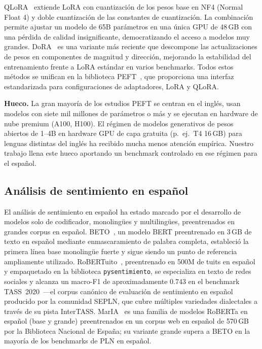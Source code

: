 \documentclass[conference]{IEEEtran}
\begin{document}
QLoRA~\cite{dettmers2023qlora} extiende LoRA con cuantización de los pesos base
en NF4 (Normal Float 4) y doble cuantización de las constantes de cuantización.
La combinación permite ajustar un modelo de 65B parámetros en una única GPU de
48\,GB con una pérdida de calidad insignificante, democratizando el acceso a
modelos muy grandes.
DoRA~\cite{liu2022dora} es una variante más reciente que descompone las
actualizaciones de pesos en componentes de magnitud y dirección, mejorando la
estabilidad del entrenamiento frente a LoRA estándar en varios benchmarks.
Todos estos métodos se unifican en la biblioteca PEFT~\cite{mangrulkar2022peft},
que proporciona una interfaz estandarizada para configuraciones de adaptadores,
LoRA y QLoRA.

\textbf{Hueco.}
La gran mayoría de los estudios PEFT se centran en el inglés, usan modelos con
siete mil millones de parámetros o más y se ejecutan en hardware de nube premium
(A100, H100).
El régimen de modelos generativos de pesos abiertos de 1--4B en hardware GPU de
capa gratuita (p.\ ej.\ T4 16\,GB) para lenguas distintas del inglés ha recibido
mucha menos atención empírica.
Nuestro trabajo llena este hueco aportando un benchmark controlado en ese régimen
para el español.

\subsection{Análisis de sentimiento en español}
\label{sec:related_sentiment}

El análisis de sentimiento en español ha estado marcado por el desarrollo de
modelos solo de codificador, monolingües y multilingües, preentrenados en
grandes corpus en español.
BETO~\cite{canete2020beto}, un modelo BERT preentrenado en 3\,GB de texto en
español mediante enmascaramiento de palabra completa, estableció la primera
línea base monolingüe fuerte y sigue siendo un punto de referencia ampliamente
utilizado.
RoBERTuito~\cite{perez2022robertuito}, preentrenado en 500M de tuits en español
y empaquetado en la biblioteca \texttt{pysentimiento}, se especializa en texto
de redes sociales y alcanza un macro-F1 de aproximadamente 0.743 en el
benchmark TASS~2020~\cite{diazgaliano2020tass}---el corpus canónico de
evaluación de sentimiento en español producido por la comunidad SEPLN, que
cubre múltiples variedades dialectales a través de su pista InterTASS.
MarIA~\cite{gutierrezfandino2022maria} es una familia de modelos RoBERTa en
español (base y grande) preentrenados en un corpus web en español de 570\,GB
por la Biblioteca Nacional de España; su variante grande supera a BETO en la
mayoría de los benchmarks de PLN en español.
\end{document}
